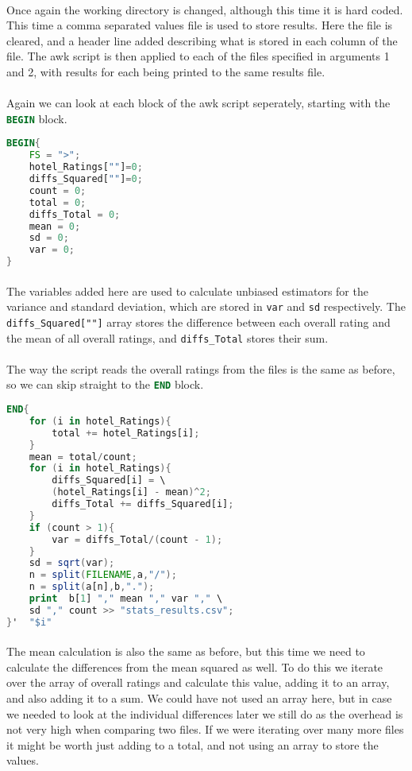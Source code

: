 \documentclass[10pt]{article}
\begin{document}
\paragraph{}
Once again the working directory is changed, although this time it is hard coded. This time a comma separated values file is used to store results. Here the file is cleared, and a header line added describing what is stored in each column of the file. The awk script is then applied to each of the files specified in arguments 1 and 2, with results for each being printed to the same results file.
\paragraph{}
\pagebreak
Again we can look at each block of the awk script seperately, starting with the \lstinline[language=awk]$BEGIN$ block.
\begin{lstlisting}[language=awk]
BEGIN{
	FS = ">";
	hotel_Ratings[""]=0;
	diffs_Squared[""]=0;
	count = 0;
	total = 0;
	diffs_Total = 0;
	mean = 0;
	sd = 0;
	var = 0;
}
\end{lstlisting}
\paragraph{}
The variables added here are used to calculate unbiased estimators for the variance and standard deviation, which are stored in \lstinline$var$ and \lstinline$sd$ respectively. The \lstinline$diffs_Squared[""]$ array stores the difference between each overall rating and the mean of all overall ratings, and \lstinline$diffs_Total$ stores their sum. 
\paragraph{}
The way the script reads the overall ratings from the files is the same as before, so we can skip straight to the \lstinline[language=awk]$END$ block.

\begin{lstlisting}[language=awk]
END{
	for (i in hotel_Ratings){
		total += hotel_Ratings[i];
	}
	mean = total/count;
	for (i in hotel_Ratings){
		diffs_Squared[i] = \
		(hotel_Ratings[i] - mean)^2;
		diffs_Total += diffs_Squared[i];
	}
	if (count > 1){
		var = diffs_Total/(count - 1);
	}
	sd = sqrt(var);
	n = split(FILENAME,a,"/");
	n = split(a[n],b,".");
	print  b[1] "," mean "," var "," \
	sd "," count >> "stats_results.csv";  
}'  "$i"
\end{lstlisting}
\pagebreak
\paragraph{}
The mean calculation is also the same as before, but this time we need to calculate the differences from the mean squared as well. To do this we iterate over the array of overall ratings and calculate this value, adding it to an array, and also adding it to a sum. We could have not used an array here, but in case we needed to look at the individual differences later we still do as the overhead is not very high when comparing two files. If we were iterating over many more files it might be worth just adding to a total, and not using an array to store the values.
\end{document}
